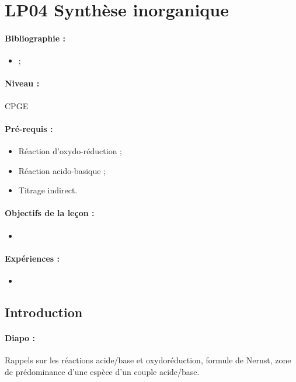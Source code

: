 \section{LP04 Synthèse inorganique}

\paragraph{Bibliographie :}
\begin{itemize}
\item ;
\end{itemize}

\paragraph{Niveau :} CPGE

\paragraph{Pré-requis :}
\begin{itemize}
\item Réaction d'oxydo-réduction ;
\item Réaction acido-basique ;
\item Titrage indirect.
\end{itemize}

\paragraph{Objectifs de la leçon :}
\begin{itemize}
\item
\end{itemize}

\paragraph{Expériences :}
\begin{itemize}
\item
\end{itemize}


\subsection{Introduction}

\paragraph{Diapo :} Rappels sur les réactions acide/base et oxydoréduction, formule de Nernst, zone de prédominance d'une espèce d'un couple acide/base.

